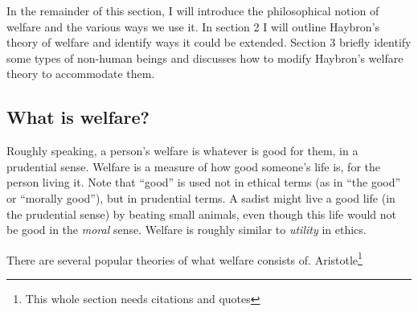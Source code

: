 \documentclass{article}
\begin{document}
In the remainder of this section, I will introduce the philosophical notion of welfare and the various ways we use it. In section 2 I will outline Haybron's theory of welfare and identify ways it could be extended. Section 3 briefly identify some types of non-human beings and discusses how to modify Haybron's welfare theory to accommodate them.

\subsection{What is welfare?}

Roughly speaking, a person's welfare is whatever is good for them, in a prudential sense. Welfare is a measure of how good someone's life is, for the person living it. Note that ``good'' is used not in ethical terms (as in ``the good'' or ``morally good''), but in prudential terms. A sadist might live a good life (in the prudential sense) by beating small animals, even though this life would not be good in the \textit{moral} sense. Welfare is roughly similar to \textit{utility} in ethics. 

There are several popular theories of what welfare consists of. Aristotle\footnote{This whole section needs citations and quotes} 





\end{document}
